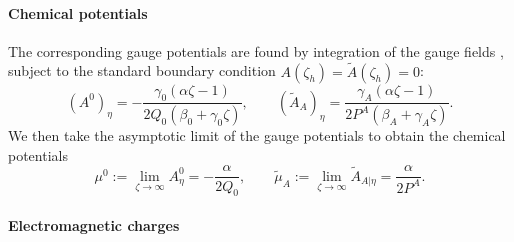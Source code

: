 \paragraph{Chemical potentials}

The corresponding gauge potentials are found by integration of the gauge fields , subject to the standard boundary condition $A(\zeta_h) = \tilde{A}(\zeta_h) = 0$:
\begin{equation*}
    (A^{0})_\eta = -\frac{\gamma_0 (\alpha  \zeta -1)}{2 Q_0 \left(\beta _0+\gamma_0  \zeta \right)} ,
\qquad
    (\tilde{A}_{A})_\eta = \frac{\gamma_A (\alpha  \zeta -1)}{2 P^A \left(\beta_A+\gamma_A  \zeta \right)} .
\end{equation*}
We then take the asymptotic limit of the gauge potentials to obtain the chemical potentials
\begin{equation*}
    \mu^0 := \lim_{\zeta \rightarrow \infty} A^0_\eta = -\frac{\alpha}{2Q_0}, 
    \qquad 
    \tilde{\mu}_A := \lim_{\zeta \rightarrow \infty} \tilde{A}_{A |\eta} = \frac{\alpha}{2P^A}. 
\end{equation*}

\paragraph{Electromagnetic charges}


